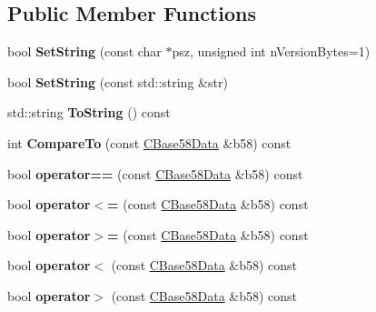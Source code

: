 \subsection*{Public Member Functions}
\begin{DoxyCompactItemize}
\item 
\mbox{\label{class_c_base58_data_a250fa3bc97d03c7d87de5485c8b49b57}} 
bool {\bfseries Set\+String} (const char $\ast$psz, unsigned int n\+Version\+Bytes=1)
\item 
\mbox{\label{class_c_base58_data_a8e0cba75a3e0a5b21defaf1471d8659c}} 
bool {\bfseries Set\+String} (const std\+::string \&str)
\item 
\mbox{\label{class_c_base58_data_a7dc91af403ca02694b3247b15604e220}} 
std\+::string {\bfseries To\+String} () const
\item 
\mbox{\label{class_c_base58_data_ad89d6bd7afa8d831dffce12803c5f58d}} 
int {\bfseries Compare\+To} (const \mbox{\hyperlink{class_c_base58_data}{C\+Base58\+Data}} \&b58) const
\item 
\mbox{\label{class_c_base58_data_a2e7a634c3a008adf3f74d72ed9dbd68c}} 
bool {\bfseries operator==} (const \mbox{\hyperlink{class_c_base58_data}{C\+Base58\+Data}} \&b58) const
\item 
\mbox{\label{class_c_base58_data_a1d99c2d0a82cbe648ba2a99e41386486}} 
bool {\bfseries operator$<$=} (const \mbox{\hyperlink{class_c_base58_data}{C\+Base58\+Data}} \&b58) const
\item 
\mbox{\label{class_c_base58_data_a0cac1805398e2b09a498ba884c7a0057}} 
bool {\bfseries operator$>$=} (const \mbox{\hyperlink{class_c_base58_data}{C\+Base58\+Data}} \&b58) const
\item 
\mbox{\label{class_c_base58_data_a7377c5628c43551ca22af1c0dfbaebae}} 
bool {\bfseries operator$<$} (const \mbox{\hyperlink{class_c_base58_data}{C\+Base58\+Data}} \&b58) const
\item 
\mbox{\label{class_c_base58_data_a7d8052eacc8de55a0f4ec91306dfbec3}} 
bool {\bfseries operator$>$} (const \mbox{\hyperlink{class_c_base58_data}{C\+Base58\+Data}} \&b58) const
\end{DoxyCompactItemize}
